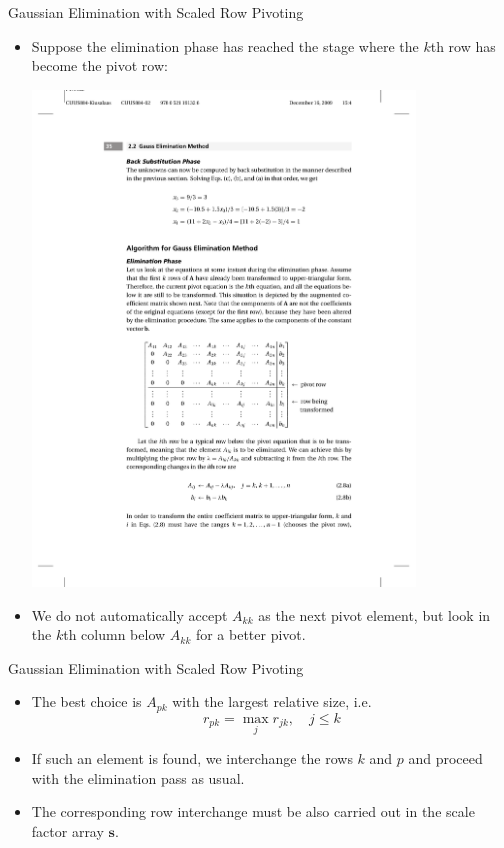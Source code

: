 \documentclass{beamer}
\newcommand{\beforeverb}{\footnotesize}
\newcommand{\afterverb}{\normalsize}
\begin{document}
\begin{frame}{Gaussian Elimination with Scaled Row Pivoting}
\begin{itemize}
\item Suppose the elimination phase has reached the stage where the $k$th row has become the pivot row:
\centerline{\includegraphics[width=0.8\textwidth]{Lec10_Fig2}}
\item We do not automatically accept $A_{kk}$ as the next pivot element, but look in the $k$th column below $A_{kk}$ for a \alert{better} pivot.
\end{itemize}
\end{frame}
\begin{frame}{Gaussian Elimination with Scaled Row Pivoting}
\begin{itemize}
\item The best choice is $A_{pk}$ with the \alert{largest relative size}, i.e.
\beforeverb
\[
r_{pk}=\max_j r_{jk},\quad j\le k
\]
\afterverb
\item If such an element is found, we interchange the rows $k$ and $p$ and proceed with the elimination pass as usual. 
\item The corresponding row interchange must  be also carried out in the \alert{scale factor array} $\mathbf{s}$.
\end{itemize}
\end{frame}
\end{document}
